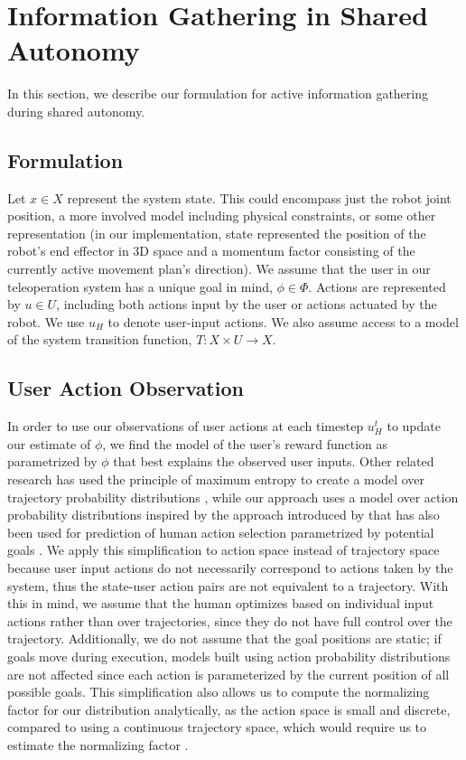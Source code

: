 \documentclass[conference]{IEEEtran}
\begin{document}
\section{Information Gathering in Shared Autonomy}\label{formulation}

In this section, we describe our formulation for active information gathering during shared autonomy.

\subsection{Formulation}

Let $ x \in X $ represent the system state. This could encompass just the robot joint position, a more involved model including physical constraints, or some other representation (in our implementation, state represented the position of the robot's end effector in 3D space and a momentum factor consisting of the currently active movement plan's direction). We assume that the user in our teleoperation system has a unique goal in mind, $\phi \in \Phi$. Actions are represented by $ u \in U $, including both actions input by the user or actions actuated by the robot. We use $u_H$ to denote user-input actions. We also assume access to a model of the system transition function, $T: X \times U \rightarrow X$.

\subsection{User Action Observation}
In order to use our observations of user actions at each timestep $u_H^t$ to update our estimate of $\phi$, we find the model of the user's reward function as parametrized by $\phi$ that best explains the observed user inputs. Other related research has used the principle of maximum entropy \cite{ziebart2008maximum} to create a model over trajectory probability distributions \cite{dragan2012formalizing, javdani2015shared}, while our approach uses a model over action probability distributions inspired by the approach introduced by  \citet{ramachandran2007bayesian} that has also been used for prediction of human action selection parametrized by potential goals \cite{fisac2018probabilistically}. We apply this simplification to action space instead of trajectory space because user input actions do not necessarily correspond to actions taken by the system, thus the state-user action pairs are not equivalent to a trajectory. With this in mind, we assume that the human optimizes based on individual input actions rather than over trajectories, since they do not have full control over the trajectory. Additionally, we do not assume that the goal positions are static; if goals move during execution, models built using action probability distributions are not affected since each action is parameterized by the current position of all possible goals. This simplification also allows us to compute the normalizing factor for our distribution analytically, as the action space is small and discrete, compared to using a continuous trajectory space, which would require us to estimate the normalizing factor \cite{javdani2015shared}.
\end{document}
